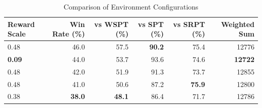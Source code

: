 \begin{table}[htbp]%
\centering%
\begin{tabular}{lrrrrr}%
\toprule%
\textbf{Reward Scale}&\textbf{Win Rate (\%)}&\textbf{vs WSPT (\%)}&\textbf{vs SPT (\%)}&\textbf{vs SRPT (\%)}&\textbf{Weighted Sum}\\%
\midrule%
0.48&46.0&57.5&\textbf{90.2}&75.4&12776\\%
\textbf{0.09}&44.0&53.7&93.6&74.6&\textbf{12722}\\%
0.48&42.0&51.9&91.3&73.7&12855\\%
0.48&41.0&50.6&87.2&\textbf{75.9}&12800\\%
0.38&\textbf{38.0}&\textbf{48.1}&86.4&71.7&12786\\%
\bottomrule%
\end{tabular}%
\caption{Comparison of Environment Configurations}%
\label{tab:environment}%
\end{table}